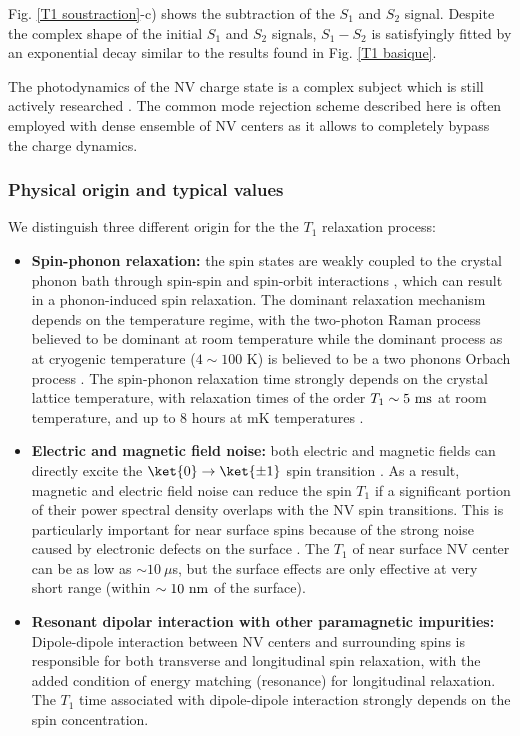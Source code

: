 \documentclass[a4paper, 11pt]{report}
\begin{document}
Fig. \ref{T1 soustraction}-c) shows the subtraction of the $S_1$ and $S_2$ signal. Despite the complex shape of the initial $S_1$ and $S_2$ signals, $S_1-S_2$ is satisfyingly fitted by an exponential decay similar to the results found in Fig. \ref{T1 basique}.

The photodynamics of the NV charge state is a complex subject which is still actively researched \citep{craik2020microwave, gorrini2021long}. The common mode rejection scheme described  here is often employed with dense ensemble of NV centers \citep{jarmola2012temperature, mrozek2015longitudinal, choi2017depolarization} as it allows to completely bypass the charge dynamics.

\subsubsection{Physical origin and typical values}

We distinguish three different origin for the the $T_1$ relaxation process:
\begin{itemize}
\item \textbf{Spin-phonon relaxation:} the spin states are weakly coupled to the crystal phonon bath through spin-spin and spin-orbit interactions \citep{norambuena2018spin}, which can result in a phonon-induced spin relaxation. The dominant relaxation mechanism depends on the  temperature regime, with the two-photon Raman process believed to be dominant at room temperature \citep{takahashi2008quenching, jarmola2012temperature} while the dominant process as at cryogenic temperature ($4\sim100$ K) is believed to be a two phonons Orbach process \citep{redman1991spin, norambuena2018spin}. The spin-phonon relaxation time strongly depends on the crystal lattice temperature, with relaxation times of the order $T_1 \sim 5\ \rm ms$ at room temperature, and up to 8 hours at  mK temperatures \citep{astner2018solid}.

\item \textbf{Electric and magnetic field noise:} both electric and magnetic fields can directly excite the $\ket{0} \to \ket{\pm 1}$ spin transition \citep{udvarhelyi2018spin}. As a result, magnetic and electric field noise can reduce the spin $T_1$ if a significant portion of their power spectral density overlaps with the NV spin transitions. This is particularly important for near surface spins because of the strong noise caused by electronic defects on the surface \citep{sangtawesin2019origins}. The $T_1$ of near surface NV center can be as low as $\sim 10\ \mu$s, but the surface effects are only effective at very short range (within $\sim 10\ \rm nm$ of the surface).

\item \textbf{Resonant dipolar interaction with other paramagnetic impurities:} Dipole-dipole interaction between NV centers and surrounding spins is responsible for both transverse and longitudinal spin relaxation, with the added condition of energy matching (resonance) for longitudinal relaxation. The $T_1$ time associated with dipole-dipole interaction strongly depends on the spin concentration.
\end{itemize}
\end{document}
